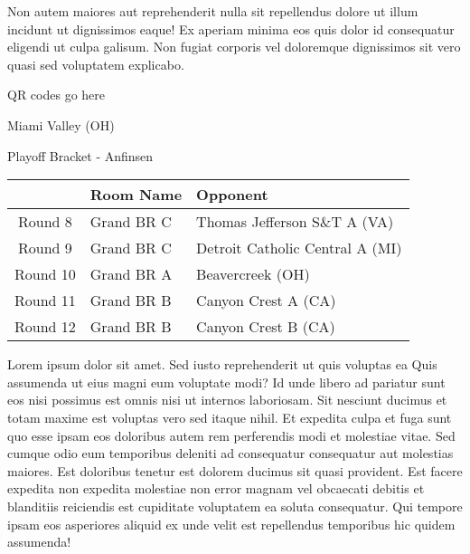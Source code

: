 \documentclass{article}%
\begin{document}
\newline%
Non autem maiores aut reprehenderit nulla sit repellendus dolore ut illum incidunt ut dignissimos eaque! Ex aperiam minima eos quis dolor id consequatur eligendi ut culpa galisum. Non fugiat corporis vel doloremque dignissimos sit vero quasi sed voluptatem explicabo.\newline%
\newline%
%
\vspace*{30pt}%
\begin{center}%
\begin{Huge}%
QR codes go here%
\end{Huge}%
\end{center}%
\newpage%
\begin{center}%
\begin{Huge}%
Miami Valley (OH)%
\end{Huge}%
\vspace*{8pt}%
\linebreak%
\begin{Large}%
Playoff Bracket {-} Anfinsen%
\end{Large}%
\end{center}%
%
\begin{tabularx}{\textwidth}{|c|Y|Y|}%
\hline%
&Room Name&Opponent\\%
\hline%
Round 8&Grand BR C&Thomas Jefferson S\&T A (VA)\\%
Round 9&Grand BR C&Detroit Catholic Central A (MI)\\%
Round 10&Grand BR A&Beavercreek (OH)\\%
Round 11&Grand BR B&Canyon Crest A (CA)\\%
Round 12&Grand BR B&Canyon Crest B (CA)\\%
\hline%
\end{tabularx}%
\vspace*{8pt}%
\linebreak%
\newline%
\newline%
Lorem ipsum dolor sit amet. Sed iusto reprehenderit ut quis voluptas ea Quis assumenda ut eius magni eum voluptate modi? Id unde libero ad pariatur sunt eos nisi possimus est omnis nisi ut internos laboriosam. Sit nesciunt ducimus et totam maxime est voluptas vero sed itaque nihil. Et expedita culpa et fuga sunt quo esse ipsam eos doloribus autem rem perferendis modi et molestiae vitae.\newline%
\newline%
Sed cumque odio eum temporibus deleniti ad consequatur consequatur aut molestias maiores. Est doloribus tenetur est dolorem ducimus sit quasi provident. Est facere expedita non expedita molestiae non error magnam vel obcaecati debitis et blanditiis reiciendis est cupiditate voluptatem ea soluta consequatur. Qui tempore ipsam eos asperiores aliquid ex unde velit est repellendus temporibus hic quidem assumenda!\newline%
\end{document}
